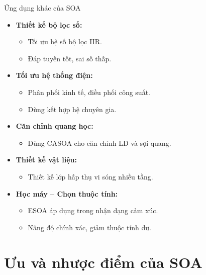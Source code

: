 \documentclass[10pt]{beamer}
\begin{document}
\begin{frame}{Ứng dụng khác của SOA}
\begin{itemize}
    \item \textbf{Thiết kế bộ lọc số:}
    \begin{itemize}
        \item Tối ưu hệ số bộ lọc IIR.
        \item Đáp tuyến tốt, sai số thấp.
    \end{itemize}

    \item \textbf{Tối ưu hệ thống điện:}
    \begin{itemize}
        \item Phân phối kinh tế, điều phối công suất.
        \item Dùng kết hợp hệ chuyên gia.
    \end{itemize}
    \item \textbf{Căn chỉnh quang học:}
    \begin{itemize}
        \item Dùng CASOA cho căn chỉnh LD và sợi quang.
    \end{itemize}

    \item \textbf{Thiết kế vật liệu:}
    \begin{itemize}
        \item Thiết kế lớp hấp thụ vi sóng nhiều tầng.
    \end{itemize}

    \item \textbf{Học máy – Chọn thuộc tính:}
    \begin{itemize}
        \item ESOA áp dụng trong nhận dạng cảm xúc.
        \item Nâng độ chính xác, giảm thuộc tính dư.
    \end{itemize}
\end{itemize}
\end{frame}











\section*{Ưu và nhược điểm của SOA}
\end{document}
